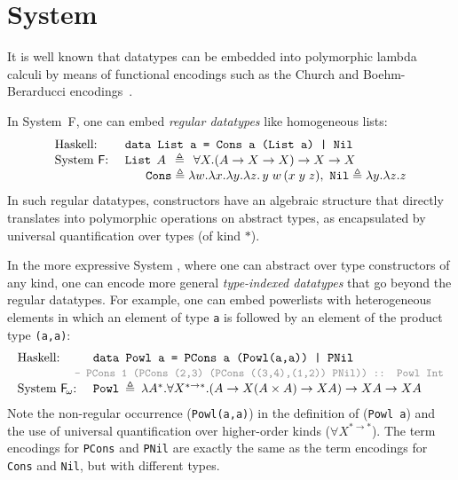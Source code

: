 \chapter{System \Fi}\label{ch:fi}

\newcommand{\newFi}[1]{\colorbox{grey}{\ensuremath{#1}}}

It is well known that datatypes can be embedded into polymorphic lambda
calculi by means of functional encodings
such as the Church and Boehm-Berarducci encodings~\cite{BoehmBerarducci}.

In System~\textsf{F}, one can embed \emph{regular datatypes}
like homogeneous lists:
\[
\begin{array}{ll}
\text{Haskell:} & \texttt{data List a = Cons a (List a) | Nil} \\
\text{System \textsf{F}:}~& 
\texttt{{List}}\:\: A\:\:\triangleq\:\:
\forall X.
(A\to X\to X) \to X \to X ~~\; \\
&
\quad~~
\texttt{Cons} \triangleq \lambda w.\lambda x.\lambda y.\lambda z.\,y\;w\,(x\;y\;z),~
\texttt{Nil} \triangleq \lambda y.\lambda z.z
\end{array}
\]
In such regular datatypes, constructors have an algebraic structure that
directly translates into polymorphic operations on abstract types,
as encapsulated by universal quantification over types (of kind $*$).

In the more expressive System \Fw, where one can abstract over
type constructors of any kind, one can encode more general
\emph{type-indexed datatypes} that go beyond the regular datatypes.
For example, one can embed powerlists with heterogeneous elements
in which an element of type \texttt{a} is followed by
an element of the product type \texttt{(a,a)}:
\[
\begin{array}{ll}
\text{Haskell:} & \texttt{data Powl a = 
        PCons a (Powl(a,a))
        | 
        PNil 
} \\
& \!\!\!\!\!\!\!\!\!
  \textcolor{gray}{\small\texttt{-- PCons 1 (PCons (2,3) (PCons ((3,4),(1,2)) PNil)) :: Powl Int}}\\
\text{System \Fw:}~& \texttt{{Powl}}\:\triangleq\:
\lambda A^{*}.\forall X^{*\to*}. (A\to X(A\times A)\to X A) \to X A \to XA
\end{array}
\]
Note the non-regular occurrence (\texttt{Powl(a,a)}) in the definition of
(\texttt{Powl a}) and the use of universal quantification over
higher-order kinds ($\forall X^{*\to*}$).
The term encodings for {\small\tt PCons} and {\small\tt PNil} are exactly
the same as the term encodings for {\small\tt Cons} and {\small\tt Nil},
but with different types.


